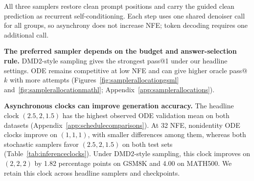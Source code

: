 \documentclass[11pt,letterpaper]{article}
\begin{document}
All three samplers restore clean prompt positions and carry the guided clean prediction as recurrent self-conditioning. Each step uses one shared denoiser call for all groups, so asynchrony does not increase NFE; token decoding requires one additional call.

\textbf{The preferred sampler depends on the budget and answer-selection rule.}
DMD2-style sampling gives the strongest pass@1 under our headline settings. ODE remains competitive at low NFE and can give higher oracle pass@$k$ with more attempts (Figures~\ref{fig:samplerallocationgsml} and~\ref{fig:samplerallocationmathl}; Appendix~\ref{app:samplerallocations}).

\textbf{Asynchronous clocks can improve generation accuracy.}
The headline clock $(2.5,2,1.5)$ has the highest observed ODE validation mean on both datasets (Appendix~\ref{app:schedulecomparisons}). At 32 NFE, nonidentity ODE clocks improve on $(1,1,1)$, with smaller differences among them, whereas both stochastic samplers favor $(2.5,2,1.5)$ on both test sets (Table~\ref{tab:inferenceclocks}). Under DMD2-style sampling, this clock improves on $(2,2,2)$ by 1.82 percentage points on GSM8K and 4.00 on MATH500. We retain this clock across headline samplers and checkpoints.
\end{document}
